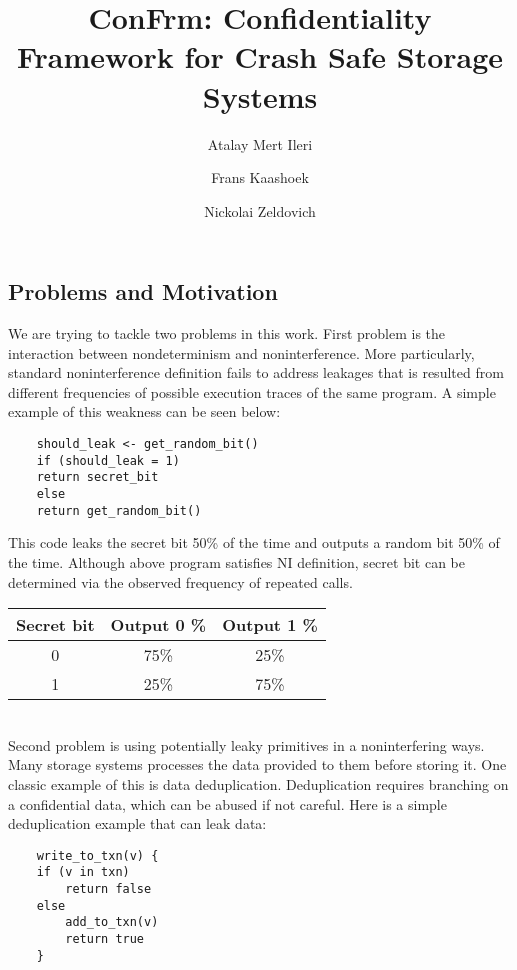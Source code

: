 \documentclass[onecolumn]{paper}
\title{ConFrm: Confidentiality Framework for Crash Safe Storage Systems}
\author{Atalay Mert Ileri \and Frans Kaashoek \and Nickolai Zeldovich}
\begin{document}
\maketitle


\subsection*{Problems and Motivation}
We are trying to tackle two problems in this work. First problem is the interaction between nondeterminism and noninterference. More particularly, standard noninterference definition fails to address leakages that is resulted from different frequencies of possible execution traces of the same program. A simple example of this weakness can be seen below:

\begin{verbatim}
	should_leak <- get_random_bit()
	if (should_leak = 1)
	return secret_bit
	else
	return get_random_bit()
\end{verbatim}

This code leaks the secret bit 50\% of the time and outputs a random bit 50\% of the time.
Although above program satisfies NI definition, secret bit can be determined via the observed frequency of repeated calls.\\

\begin{tabular}{| c | c | c |}
	\hline
	Secret bit & Output 0 \% & Output 1 \% \\
	\hline
	0 &	75\% & 25\% \\
	\hline
	1 &	25\% & 75\% \\
	\hline
\end{tabular}\\
 
 
Second problem is using potentially leaky primitives in a noninterfering ways. Many storage systems processes the data provided to them before storing it. One classic example of this is data deduplication. Deduplication requires branching on a confidential data, which can be abused if not careful. Here is a simple deduplication example that can leak data:

\begin{verbatim}
	write_to_txn(v) {
	if (v in txn)
		return false
	else
		add_to_txn(v)
		return true
	}
\end{verbatim}
\end{document}

